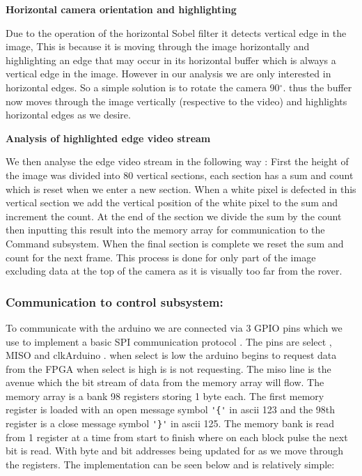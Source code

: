 \documentclass[10pt,twoside]{article}
\begin{document}
\textbf{Horizontal camera orientation and highlighting}

Due to the operation of the horizontal Sobel filter it detects vertical edge in the image, This is because it is moving through the image horizontally and highlighting an edge that may occur in its horizontal buffer which is always a vertical edge in the image. However in our analysis we are only interested in horizontal edges. So a simple solution  is to rotate the camera 90$^\circ$. thus the buffer now moves through the image vertically (respective to the video) and highlights horizontal edges as we desire.

\textbf{Analysis of highlighted edge video stream}

We then analyse the edge video stream in the following way : First the height of the image was divided into  80 vertical sections, each section has a sum and count which is reset when we enter a new section. When a white pixel is defected in this vertical section we add the vertical position of the white pixel to the sum and increment the count. At the end of the section we divide the sum by the count then inputting this result into the memory array for communication to the Command subsystem. When the final section is complete we reset the sum and count for the next frame. This process is done for only part of the image excluding data at the top of the camera as it is visually too far from the rover. 

\subsubsection{Communication to control subsystem:}

To communicate with the arduino we are connected via 3 GPIO pins which we use to implement a basic SPI communication protocol  . The pins are select , MISO and clkArduino . when select is low the arduino begins to request data from the FPGA when select is high is is not requesting. The miso line is the avenue which the bit stream of data from the memory array will flow. The memory array is a bank 98 registers storing 1 byte each. The first memory register is loaded with an open message symbol \verb|'{'| in ascii 123 and the 98th register is a close message symbol \verb|'}'| in ascii 125. The memory bank is read from 1 register at a time from start to finish where on each block pulse the next bit is read. With byte and bit addresses being updated for as we move through the registers. The implementation can be seen below and is relatively simple: 
\end{document}
